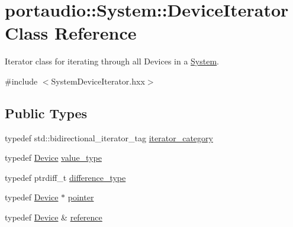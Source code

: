 \hypertarget{classportaudio_1_1_system_1_1_device_iterator}{}\section{portaudio\+:\+:System\+:\+:Device\+Iterator Class Reference}
\label{classportaudio_1_1_system_1_1_device_iterator}


Iterator class for iterating through all Devices in a \hyperlink{classportaudio_1_1_system}{System}.  




{\ttfamily \#include $<$System\+Device\+Iterator.\+hxx$>$}

\subsection*{Public Types}
\begin{DoxyCompactItemize}
\item 
typedef std\+::bidirectional\+\_\+iterator\+\_\+tag \hyperlink{classportaudio_1_1_system_1_1_device_iterator_a937d4b9bc319a53285b5f67fb784aeb3}{iterator\+\_\+category}
\item 
typedef \hyperlink{classportaudio_1_1_device}{Device} \hyperlink{classportaudio_1_1_system_1_1_device_iterator_a7a5edd66daeb6546c7717d2514e7804e}{value\+\_\+type}
\item 
typedef ptrdiff\+\_\+t \hyperlink{classportaudio_1_1_system_1_1_device_iterator_a249b0344098059e35dc0340b20879bf4}{difference\+\_\+type}
\item 
typedef \hyperlink{classportaudio_1_1_device}{Device} $\ast$ \hyperlink{classportaudio_1_1_system_1_1_device_iterator_aacd426e630b8d6526f7a0570dfafa8ee}{pointer}
\item 
typedef \hyperlink{classportaudio_1_1_device}{Device} \& \hyperlink{classportaudio_1_1_system_1_1_device_iterator_a828c6489c4aaecc29cee8d861aee349f}{reference}
\end{DoxyCompactItemize}
